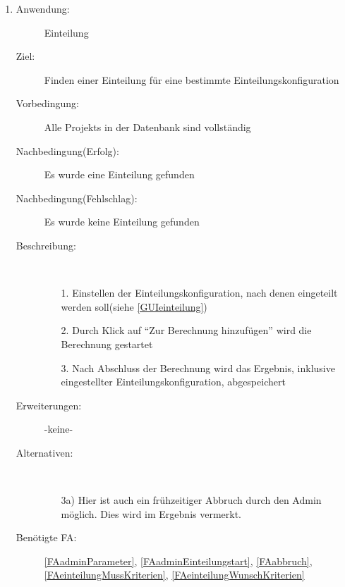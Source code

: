 \documentclass[parskip=full]{scrartcl}
\newcommand{\swtLabel}[1]{\textbf{/#1\arabic*0/}}
\begin{document}
\begin{enumerate} [label=\swtLabel{A}]
  
  \item \label{UCadminEinteilungStart}
  \begin{description}
  \item[Anwendung:] \gls{Einteilung}
  \item[Ziel:] Finden einer \gls{Einteilung} für eine bestimmte \gls{Einteilungskonfiguration}
  	\item[Vorbedingung:] Alle \glspl{Projekt} in der Datenbank sind vollständig
  	\item[Nachbedingung(Erfolg):] Es wurde eine \gls{Einteilung} gefunden
  	\item[Nachbedingung(Fehlschlag):] Es wurde keine \gls{Einteilung} gefunden
  	\item[Beschreibung:]~
  	\begin{enumerate} 
  	  \item[1.] Einstellen der \gls{Einteilungskonfiguration}, nach denen eingeteilt werden
  	  soll(siehe \autoref{GUIeinteilung})
  	  \item[2.] Durch Klick auf \enquote{Zur Berechnung hinzufügen} wird die
  	  Berechnung gestartet
  	  \item[3.] Nach Abschluss der Berechnung wird das Ergebnis,  inklusive
  	  eingestellter \gls{Einteilungskonfiguration}, abgespeichert
  	\end{enumerate}
  	\item[Erweiterungen:] -keine-
  	\item[Alternativen:] ~
  	\begin{enumerate}
  	  \item[3a)] Hier ist auch ein frühzeitiger Abbruch durch den \gls{Admin}
  	  möglich. Dies wird im Ergebnis vermerkt.
  	 \end{enumerate}  
  	 \item[Benötigte FA:] \ref{FAadminParameter},
  	 \ref{FAadminEinteilungstart}, \ref{FAabbruch},
  	 \ref{FAeinteilungMussKriterien}, \ref{FAeinteilungWunschKriterien}
  \end{description}
   

\end{enumerate}
\end{document}
